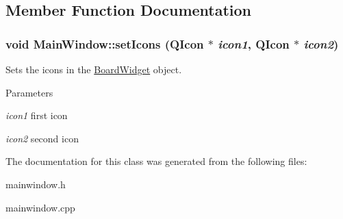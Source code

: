 \subsection{Member Function Documentation}
\hypertarget{classMainWindow_a10f971ecb683f111928d2cb656cfa792}{
\subsubsection[{setIcons}]{\setlength{\rightskip}{0pt plus 5cm}void MainWindow::setIcons (QIcon $\ast$ {\em icon1}, \/  QIcon $\ast$ {\em icon2})}}
\label{classMainWindow_a10f971ecb683f111928d2cb656cfa792}


Sets the icons in the \hyperlink{classBoardWidget}{BoardWidget} object. 


\begin{DoxyParams}{Parameters}
\item[{\em icon1}]first icon \item[{\em icon2}]second icon \end{DoxyParams}


The documentation for this class was generated from the following files:\begin{DoxyCompactItemize}
\item 
mainwindow.h\item 
mainwindow.cpp\end{DoxyCompactItemize}
